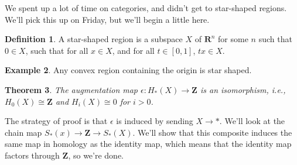 \documentclass{amsart}
\theoremstyle{theorem}
\newtheorem{theorem}{Theorem}[section]
\theoremstyle{definition}
\newtheorem{definition}[theorem]{Definition}
\newtheorem{example}[theorem]{Example}
\begin{document}
We spent up a lot of time on categories, and didn't get to star-shaped regions. We'll pick this up on Friday, but we'll begin a little here.
\begin{definition}
A star-shaped region is a subspace $X$ of $\mathbf{R}^n$ for some $n$ such that $0\in X$, such that for all $x\in X$, and for all $t\in[0,1]$, $tx\in X$. 
\end{definition}
\begin{example}
Any convex region containing the origin is star shaped.
\end{example}
\begin{theorem}
The augmentation map $\epsilon: H_\ast(X)\to \mathbf{Z}$ is an isomorphism, i.e., $ H_0(X)\cong\mathbf{Z}$ and $ H_i(X)\cong 0$ for $i>0$.
\end{theorem}
The strategy of proof is that $\epsilon$ is induced by sending $X\to \ast$. We'll look at the chain map $S_\ast(x)\to\mathbf{Z}\to S_\ast(X)$. We'll show that this composite induces the same map in homology as the identity map, which means that the identity map factors through $\mathbf{Z}$, so we're done.
\end{document}
